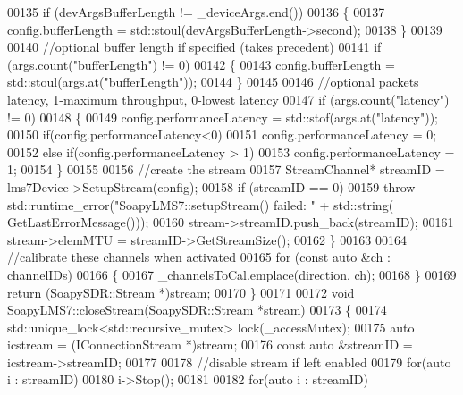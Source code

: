 \begin{DoxyCode}
00135         \textcolor{keywordflow}{if} (devArgsBufferLength != \_deviceArgs.end())
00136         \{
00137             config.bufferLength = std::stoul(devArgsBufferLength->second);
00138         \}
00139 
00140         \textcolor{comment}{//optional buffer length if specified (takes precedent)}
00141         \textcolor{keywordflow}{if} (args.count(\textcolor{stringliteral}{"bufferLength"}) != 0)
00142         \{
00143             config.bufferLength = std::stoul(args.at(\textcolor{stringliteral}{"bufferLength"}));
00144         \}
00145 
00146         \textcolor{comment}{//optional packets latency, 1-maximum throughput, 0-lowest latency}
00147         \textcolor{keywordflow}{if} (args.count(\textcolor{stringliteral}{"latency"}) != 0)
00148         \{
00149             config.performanceLatency = std::stof(args.at(\textcolor{stringliteral}{"latency"}));
00150             \textcolor{keywordflow}{if}(config.performanceLatency<0)
00151                 config.performanceLatency = 0;
00152             \textcolor{keywordflow}{else} \textcolor{keywordflow}{if}(config.performanceLatency > 1)
00153                 config.performanceLatency = 1;
00154         \}
00155 
00156         \textcolor{comment}{//create the stream}
00157         StreamChannel* streamID = lms7Device->SetupStream(config);
00158         \textcolor{keywordflow}{if} (streamID == 0)
00159             \textcolor{keywordflow}{throw} std::runtime\_error(\textcolor{stringliteral}{"SoapyLMS7::setupStream() failed: "} + std::string(
      GetLastErrorMessage()));
00160         stream->streamID.push\_back(streamID);
00161         stream->elemMTU = streamID->GetStreamSize();
00162     \}
00163 
00164     \textcolor{comment}{//calibrate these channels when activated}
00165     \textcolor{keywordflow}{for} (\textcolor{keyword}{const} \textcolor{keyword}{auto} &ch : channelIDs)
00166     \{
00167         \_channelsToCal.emplace(direction, ch);
00168     \}
00169     \textcolor{keywordflow}{return} (SoapySDR::Stream *)stream;
00170 \}
00171 
00172 \textcolor{keywordtype}{void} SoapyLMS7::closeStream(SoapySDR::Stream *stream)
00173 \{
00174     std::unique\_lock<std::recursive\_mutex> lock(\_accessMutex);
00175     \textcolor{keyword}{auto} icstream = (IConnectionStream *)stream;
00176     \textcolor{keyword}{const} \textcolor{keyword}{auto} &streamID = icstream->streamID;
00177 
00178     \textcolor{comment}{//disable stream if left enabled}
00179     \textcolor{keywordflow}{for}(\textcolor{keyword}{auto} i : streamID)
00180         i->Stop();
00181 
00182     \textcolor{keywordflow}{for}(\textcolor{keyword}{auto} i : streamID)

\end{DoxyCode}
